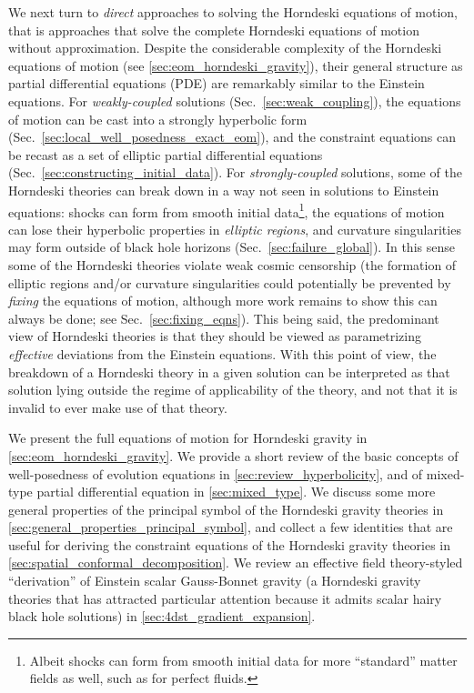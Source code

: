 \documentclass{ws-ijmpd}
\begin{document}
We next turn to \emph{direct} approaches to solving the Horndeski
equations of motion, that is approaches that solve the complete
Horndeski equations of motion without approximation.
Despite the considerable complexity of the Horndeski equations
of motion (see \ref{sec:eom_horndeski_gravity}), 
their general structure as partial differential equations (PDE) 
are remarkably similar to the Einstein 
equations\cite{Kovacs:2020pns,Kovacs:2020ywu,
Kovacs:2021lgk,Kovacs:2021vdk,Reall:2021voz}. 
For \emph{weakly-coupled} solutions (Sec.~\ref{sec:weak_coupling}),
the equations of motion can be cast
into a strongly hyperbolic form (Sec.~\ref{sec:local_well_posedness_exact_eom}),
and the constraint equations can be recast as a set of elliptic
partial differential equations (Sec.~\ref{sec:constructing_initial_data}).
For \emph{strongly-coupled} solutions, some of the Horndeski theories 
can break down in a way  
not seen in solutions to Einstein equations:
shocks can form from smooth initial data\footnote{Albeit shocks can 
form from smooth initial data 
for more ``standard'' matter fields as well, such
as for perfect fluids\cite{rezzolla2013relativistic}.},
the equations of motion can lose their hyperbolic properties 
in \emph{elliptic regions}, and curvature singularities
may form outside of black hole horizons (Sec.~\ref{sec:failure_global}).
In this sense some of the Horndeski theories violate 
weak cosmic censorship\cite{Ripley:2019hxt,Ripley:2019irj,
Figueras:2020dzx,East:2021bqk} (the formation of elliptic
regions and/or curvature singularities 
could potentially be prevented by \emph{fixing} the equations
of motion, although more work remains to show this can always be done; 
see Sec.~\ref{sec:fixing_eqns}).
This being said, the predominant view of Horndeski theories is that they
should be viewed as parametrizing \emph{effective} deviations from
the Einstein equations. 
With this point of view, the breakdown of a Horndeski
theory in a given solution can be interpreted as that solution lying outside
the regime of applicability of the theory, 
and not that it is invalid to ever make use of that theory.

We present the full equations of motion for Horndeski gravity
in \ref{sec:eom_horndeski_gravity}. 
We provide a short review of the basic concepts of
well-posedness of evolution equations in
\ref{sec:review_hyperbolicity},
and of mixed-type partial differential equation in
\ref{sec:mixed_type}.
We discuss some more general properties
of the principal symbol of the Horndeski gravity theories
in \ref{sec:general_properties_principal_symbol}, and collect a few
identities that are useful for deriving the constraint equations of the
Horndeski gravity theories in \ref{sec:spatial_conformal_decomposition}.
We review an effective field
theory-styled ``derivation'' of Einstein scalar Gauss-Bonnet
gravity (a Horndeski gravity theories that has attracted particular
attention because it admits scalar hairy black hole solutions) in 
\ref{sec:4dst_gradient_expansion}.
\end{document}
